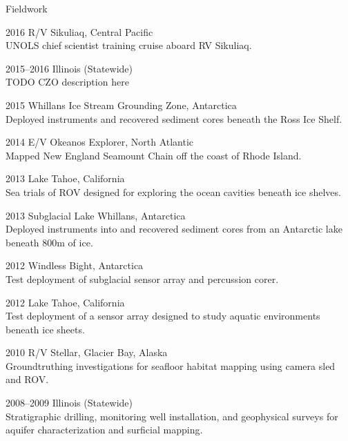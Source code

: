 \begin{cvlist}{Fieldwork} 

\item[2016] R/V Sikuliaq, Central Pacific\\
    UNOLS chief scientist training cruise aboard RV Sikuliaq.

\item[2015--2016] Illinois (Statewide)\\
    TODO CZO description here

\item[2015] Whillans Ice Stream Grounding Zone, Antarctica \\
    Deployed instruments and recovered sediment cores beneath the Ross Ice Shelf.

\item[2014] E/V Okeanos Explorer, North Atlantic \\
    Mapped New England Seamount Chain off the coast of Rhode Island.

\item[2013] Lake Tahoe, California \\
    Sea trials of ROV designed for exploring the ocean cavities beneath ice shelves.

\item[2013] Subglacial Lake Whillans, Antarctica \\
    Deployed instruments into and recovered sediment cores from an Antarctic lake beneath 800m of ice.

\item[2012] Windless Bight, Antarctica \\
    Test deployment of subglacial sensor array and percussion corer.

\item[2012] Lake Tahoe, California\\
    Test deployment of a sensor array designed to study aquatic environments beneath ice sheets.

\item[2010] R/V Stellar, Glacier Bay, Alaska \\
    Groundtruthing investigations for seafloor habitat mapping using camera sled and ROV.

\item[2008--2009] Illinois (Statewide)\\
    Stratigraphic drilling, monitoring well installation, and geophysical surveys for aquifer characterization and surficial mapping. 

\end{cvlist}
